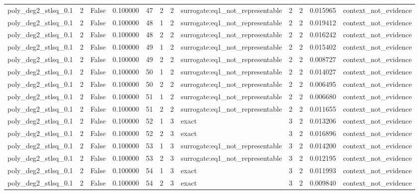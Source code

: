 \begin{tabular}{lrrrrrrlrrrl}
poly\_deg2\_stlsq\_0.1 & 2 & False & 0.100000 & 47 & 2 & 2 & surrogate:eq1\_not\_representable & 2 & 2 & 0.015965 & context\_not\_evidence \\
poly\_deg2\_stlsq\_0.1 & 2 & False & 0.100000 & 48 & 1 & 2 & surrogate:eq1\_not\_representable & 2 & 2 & 0.019412 & context\_not\_evidence \\
poly\_deg2\_stlsq\_0.1 & 2 & False & 0.100000 & 48 & 2 & 2 & surrogate:eq1\_not\_representable & 2 & 2 & 0.016242 & context\_not\_evidence \\
poly\_deg2\_stlsq\_0.1 & 2 & False & 0.100000 & 49 & 1 & 2 & surrogate:eq1\_not\_representable & 2 & 2 & 0.015402 & context\_not\_evidence \\
poly\_deg2\_stlsq\_0.1 & 2 & False & 0.100000 & 49 & 2 & 2 & surrogate:eq1\_not\_representable & 2 & 2 & 0.008727 & context\_not\_evidence \\
poly\_deg2\_stlsq\_0.1 & 2 & False & 0.100000 & 50 & 1 & 2 & surrogate:eq1\_not\_representable & 2 & 2 & 0.014027 & context\_not\_evidence \\
poly\_deg2\_stlsq\_0.1 & 2 & False & 0.100000 & 50 & 2 & 2 & surrogate:eq1\_not\_representable & 2 & 2 & 0.006495 & context\_not\_evidence \\
poly\_deg2\_stlsq\_0.1 & 2 & False & 0.100000 & 51 & 1 & 2 & surrogate:eq1\_not\_representable & 2 & 2 & 0.006680 & context\_not\_evidence \\
poly\_deg2\_stlsq\_0.1 & 2 & False & 0.100000 & 51 & 2 & 2 & surrogate:eq1\_not\_representable & 2 & 2 & 0.011655 & context\_not\_evidence \\
poly\_deg2\_stlsq\_0.1 & 2 & False & 0.100000 & 52 & 1 & 3 & exact & 3 & 2 & 0.013206 & context\_not\_evidence \\
poly\_deg2\_stlsq\_0.1 & 2 & False & 0.100000 & 52 & 2 & 3 & exact & 3 & 2 & 0.016896 & context\_not\_evidence \\
poly\_deg2\_stlsq\_0.1 & 2 & False & 0.100000 & 53 & 1 & 3 & surrogate:eq1\_not\_representable & 3 & 2 & 0.014200 & context\_not\_evidence \\
poly\_deg2\_stlsq\_0.1 & 2 & False & 0.100000 & 53 & 2 & 3 & surrogate:eq1\_not\_representable & 3 & 2 & 0.012195 & context\_not\_evidence \\
poly\_deg2\_stlsq\_0.1 & 2 & False & 0.100000 & 54 & 1 & 3 & exact & 3 & 2 & 0.011993 & context\_not\_evidence \\
poly\_deg2\_stlsq\_0.1 & 2 & False & 0.100000 & 54 & 2 & 3 & exact & 3 & 2 & 0.009840 & context\_not\_evidence \\

\end{tabular}
